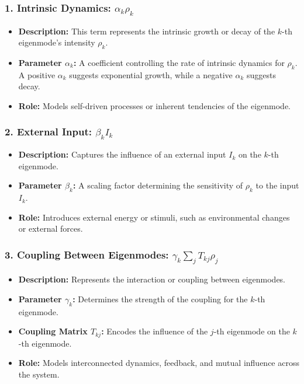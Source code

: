 \documentclass{article}
\theoremstyle{plain}
\begin{document}
\subsubsection*{1. Intrinsic Dynamics: \(\alpha_k \rho_k\)}
\begin{itemize}
    \item \textbf{Description:} This term represents the intrinsic growth or decay of the \(k\)-th eigenmode’s intensity \(\rho_k\).
    \item \textbf{Parameter \(\alpha_k\):} A coefficient controlling the rate of intrinsic dynamics for \(\rho_k\). A positive \(\alpha_k\) suggests exponential growth, while a negative \(\alpha_k\) suggests decay.
    \item \textbf{Role:} Models self-driven processes or inherent tendencies of the eigenmode.
\end{itemize}

\subsubsection*{2. External Input: \(\beta_k I_k\)}
\begin{itemize}
    \item \textbf{Description:} Captures the influence of an external input \(I_k\) on the \(k\)-th eigenmode.
    \item \textbf{Parameter \(\beta_k\):} A scaling factor determining the sensitivity of \(\rho_k\) to the input \(I_k\).
    \item \textbf{Role:} Introduces external energy or stimuli, such as environmental changes or external forces.
\end{itemize}

\subsubsection*{3. Coupling Between Eigenmodes: \(\gamma_k \sum_j T_{kj} \rho_j\)}
\begin{itemize}
    \item \textbf{Description:} Represents the interaction or coupling between eigenmodes.
    \item \textbf{Parameter \(\gamma_k\):} Determines the strength of the coupling for the \(k\)-th eigenmode.
    \item \textbf{Coupling Matrix \(T_{kj}\):} Encodes the influence of the \(j\)-th eigenmode on the \(k\)-th eigenmode.
    \item \textbf{Role:} Models interconnected dynamics, feedback, and mutual influence across the system.
\end{itemize}
\end{document}
